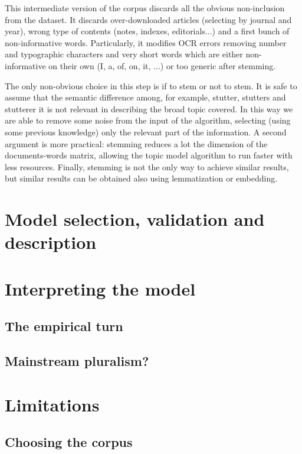 \documentclass[a4paper, 11pt, headings=standardclasses, tablecaptionsbelow]{scrartcl}
\begin{document}
This intermediate version of the corpus discards all the obvious non-inclusion from the dataset. It discards over-downloaded articles (selecting by journal and year), wrong type of contents (notes, indexes, editorials...) and a first bunch of non-informative words. Particularly, it modifies OCR errors removing number and typographic characters and very short words which are either non-informative on their own (I, a, of, on, it, ...) or too generic after stemming.

The only non-obvious choice in this step is if to stem or not to stem. It is safe to assume that the semantic difference among, for example, stutter, stutters and stutterer it is not relevant in describing the broad topic covered. In this way we are able to remove some noise from the input of the algorithm, selecting (using some previous knowledge) only the relevant part of the information. A second argument is more practical: stemming reduces a lot the dimension of the documents-words matrix, allowing the topic model algorithm to run faster with less resources.
Finally, stemming is not the only way to achieve similar results, but similar results can be obtained also using lemmatization or embedding.

\section{Model selection, validation and description}

\section{Interpreting the model}

\subsection{The empirical turn}

\subsection{Mainstream pluralism?}

\section{Limitations}
\subsection{Choosing the corpus}
\end{document}
